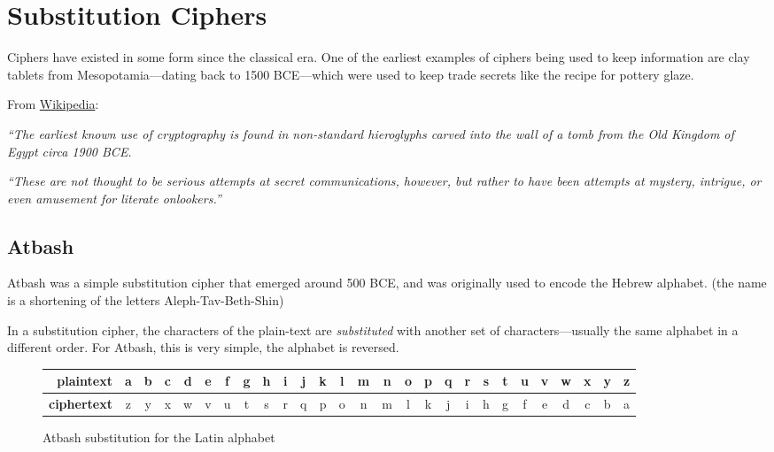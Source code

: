 \section{Substitution Ciphers}

	\ifprint\else	
		Ciphers have existed in some form since the classical era. One of the earliest examples of ciphers being used to keep information are clay tablets from Mesopotamia---dating back to 1500 BCE---which were used to keep trade secrets like the recipe for pottery glaze.
	
		\begin{aside}
			From \href{http://en.wikipedia.org/wiki/History_of_cryptography}{Wikipedia}:
			
			\textit{``The earliest known use of cryptography is found in non-standard hieroglyphs carved into the wall of a tomb from the Old Kingdom of Egypt circa 1900 BCE.}
				
			\textit{``These are not thought to be serious attempts at secret communications, however, but rather to have been attempts at mystery, intrigue, or even amusement for literate onlookers.''}
		\end{aside}
	\fi
	
\subsection{Atbash}

	Atbash was a simple substitution cipher that emerged around 500 BCE, and was originally used to encode the Hebrew alphabet.
	\ifprint\else (the name is a shortening of the letters Aleph-Tav-Beth-Shin) \fi
	
	In a substitution cipher, the characters of the plain-text are \textit{substituted} with another set of characters---usually the same alphabet in a different order. For Atbash, this is very simple, the alphabet is reversed.
	
	\begin{figure*}
		\begin{tabular}{r|cccccccccccccccccccccccccc}
			\textbf{plaintext} & a & b & c & d & e & f & g & h & i & j & k & l & m & n & o & p & q & r & s & t & u & v & w & x & y & z \\ 
			\hline
			\textbf{ciphertext} & z & y & x & w & v & u & t & s & r & q & p & o & n & m & l & k & j & i & h & g & f & e & d & c & b & a \\ 
		\end{tabular} 
		\caption{Atbash substitution for the Latin alphabet}
		\label{fig:atbash}
	\end{figure*}

